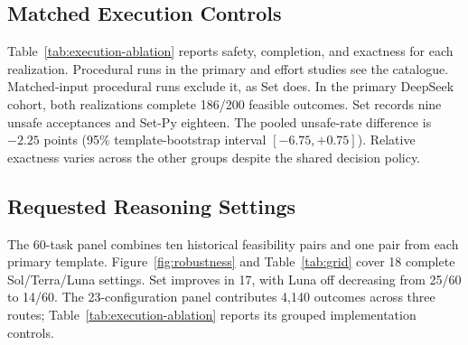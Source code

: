 \begin{table}[!tbp]
\centering\small\setlength{\tabcolsep}{6pt}

\caption{\textbf{Textual guidance and two implementations of the same framework.} Each cell gives exact-decision percentage above unsafe/false-refusal/other counts. All four routes use the same $n$ tasks within a configuration. The 40-task rows cover all 20 templates and use the pre-existing task intersection. There are 2,080 route outcomes on overlapping cohorts.}
\label{tab:four-way-controls}
\end{table}

\subsection{Matched Execution Controls}
\label{app:execution-controls}
Table~\ref{tab:execution-ablation} reports safety, completion, and exactness for each realization. Procedural runs in the primary and effort studies see the catalogue. Matched-input procedural runs exclude it, as Set does. In the primary DeepSeek cohort, both realizations complete 186/200 feasible outcomes. Set records nine unsafe acceptances and Set-Py eighteen. The pooled unsafe-rate difference is $-2.25$ points (95\% template-bootstrap interval $[-6.75,+0.75]$). Relative exactness varies across the other groups despite the shared decision policy.

\begin{table}[!tbp]
\centering\footnotesize\setlength{\tabcolsep}{4pt}

\caption{\textbf{Risk and useful completion across framework implementations.} Arrows are Set-Py$\to$Set; $n$ is per implementation. Unsafe counts unauthorized purchases; Safe requires exact purchase and utility on feasible tasks. Effort groups cover 23 completed configurations. Matched-input controls use low/high/max, with 72 tasks per setting. Cohorts and reused Set results are not pooled across groups.}
\label{tab:execution-ablation}
\label{tab:authorization}
\end{table}

\subsection{Requested Reasoning Settings}
\label{app:grid}
The 60-task panel combines ten historical feasibility pairs and one pair from each primary template. Figure~\ref{fig:robustness} and Table~\ref{tab:grid} cover 18 complete Sol/Terra/Luna settings. Set improves in 17, with Luna off decreasing from 25/60 to 14/60. The 23-configuration panel contributes 4,140 outcomes across three routes; Table~\ref{tab:execution-ablation} reports its grouped implementation controls.

